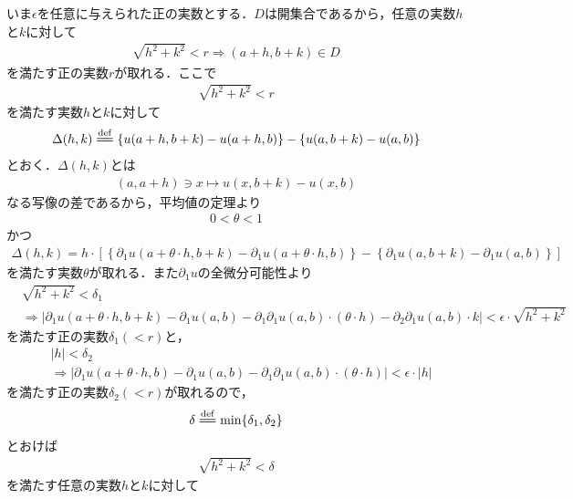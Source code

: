 	\begin{sketch}
		いま$\epsilon$を任意に与えられた正の実数とする．$D$は開集合であるから，任意の実数$h$と$k$に対して
		\begin{align}
			\sqrt{h^2 + k^2} < r \Longrightarrow (a+h,b+k) \in D
		\end{align}
		を満たす正の実数$r$が取れる．ここで
		\begin{align}
			\sqrt{h^2 + k^2} < r
		\end{align}
		を満たす実数$h$と$k$に対して
		\begin{align}
			\Delta(h,k) \defeq \left\{u(a+h,b+k) - u(a+h,b)\right\} - \left\{u(a,b+k) - u(a,b)\right\}
		\end{align}
		とおく．$\Delta(h,k)$とは
		\begin{align}
			(a,a+h) \ni x \longmapsto u(x,b+k) - u(x,b)
		\end{align}
		なる写像の差であるから，平均値の定理より
		\begin{align}
			0 < \theta < 1
		\end{align}
		かつ
		\begin{align}
			\Delta(h,k) = h \cdot \left[\left\{\partial_1 u(a+\theta \cdot h,b+k) - \partial_1 u(a+ \theta \cdot h,b)\right\} 
			- \left\{\partial_1 u(a,b+k) - \partial_1 u(a,b)\right\}\right]
		\end{align}
		を満たす実数$\theta$が取れる．また$\partial_1 u$の全微分可能性より
		\begin{align}
			&\sqrt{h^2 + k^2} < \delta_1 \\
			&\Longrightarrow \left|\partial_1 u(a+\theta \cdot h,b+k) - \partial_1 u(a,b) 
			- \partial_1 \partial_1 u(a,b) \cdot (\theta \cdot h) - \partial_2 \partial_1 u(a,b) \cdot k\right|
			< \epsilon \cdot \sqrt{h^2 + k^2}
		\end{align}
		を満たす正の実数$\delta_1(< r)$と，
		\begin{align}
			&|h| < \delta_2 \\
			&\Longrightarrow \left|\partial_1 u(a+\theta \cdot h,b) - \partial_1 u(a,b) 
			- \partial_1 \partial_1 u(a,b) \cdot (\theta \cdot h)\right|
			< \epsilon \cdot |h|
		\end{align}
		を満たす正の実数$\delta_2(< r)$が取れるので，
		\begin{align}
			\delta \defeq \min\{\delta_1,\delta_2\}
		\end{align}
		とおけば
		\begin{align}
			\sqrt{h^2 + k^2} < \delta
		\end{align}
		を満たす任意の実数$h$と$k$に対して

\end{sketch}
